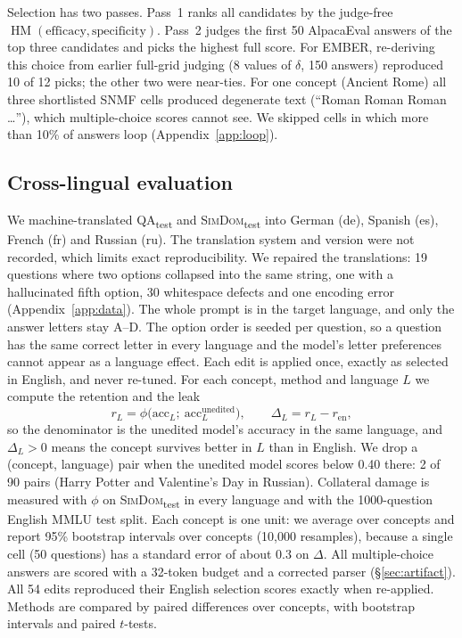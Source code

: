 \documentclass[11pt]{article}
\newcommand{\qatest}{\textsc{QA}\textsubscript{test}}
\newcommand{\simtest}{\textsc{SimDom}\textsubscript{test}}
\newcommand{\hm}{\operatorname{HM}}
\begin{document}
Selection has two passes.
Pass~1 ranks all candidates by the judge-free $\hm(\text{efficacy},\text{specificity})$.
Pass~2 judges the first 50 AlpacaEval answers of the top three candidates and picks the highest full score.
For EMBER, re-deriving this choice from earlier full-grid judging (8 values of $\delta$, 150 answers) reproduced 10 of 12 picks; the other two were near-ties.
For one concept (Ancient Rome) all three shortlisted SNMF cells produced degenerate text (``Roman Roman Roman \ldots''), which multiple-choice scores cannot see.
We skipped cells in which more than 10\% of answers loop (Appendix~\ref{app:loop}).

\subsection{Cross-lingual evaluation}
\label{sec:xl}
We machine-translated \qatest{} and \simtest{} into German (de), Spanish (es), French (fr) and Russian (ru). The translation system and version were not recorded, which limits exact reproducibility.
We repaired the translations: 19 questions where two options collapsed into the same string, one with a hallucinated fifth option, 30 whitespace defects and one encoding error (Appendix~\ref{app:data}).
The whole prompt is in the target language, and only the answer letters stay A--D.
The option order is seeded per question, so a question has the same correct letter in every language and the model's letter preferences cannot appear as a language effect.
Each edit is applied once, exactly as selected in English, and never re-tuned.
For each concept, method and language $L$ we compute the retention and the leak
\begin{equation}
  r_L = \phi\big(\mathrm{acc}_L;\ \mathrm{acc}^{\text{unedited}}_L\big), \qquad \Delta_L = r_L - r_{\text{en}},
  \label{eq:retention}
\end{equation}
so the denominator is the unedited model's accuracy in the same language, and $\Delta_L > 0$ means the concept survives better in $L$ than in English.
We drop a (concept, language) pair when the unedited model scores below 0.40 there: 2 of 90 pairs (Harry Potter and Valentine's Day in Russian).
Collateral damage is measured with $\phi$ on \simtest{} in every language and with the 1000-question English MMLU test split.
Each concept is one unit: we average over concepts and report 95\% bootstrap intervals over concepts (10{,}000 resamples), because a single cell (50 questions) has a standard error of about 0.3 on $\Delta$.
All multiple-choice answers are scored with a 32-token budget and a corrected parser (\S\ref{sec:artifact}).
All 54 edits reproduced their English selection scores exactly when re-applied.
Methods are compared by paired differences over concepts, with bootstrap intervals and paired $t$-tests.
\end{document}
